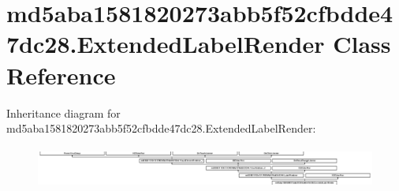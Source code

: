 \hypertarget{classmd5aba1581820273abb5f52cfbdde47dc28_1_1ExtendedLabelRender}{}\section{md5aba1581820273abb5f52cfbdde47dc28.\+Extended\+Label\+Render Class Reference}
\label{classmd5aba1581820273abb5f52cfbdde47dc28_1_1ExtendedLabelRender}
Inheritance diagram for md5aba1581820273abb5f52cfbdde47dc28.\+Extended\+Label\+Render\+:\begin{figure}[H]
\begin{center}
\leavevmode
\includegraphics[height=1.372549cm]{classmd5aba1581820273abb5f52cfbdde47dc28_1_1ExtendedLabelRender}
\end{center}
\end{figure}
